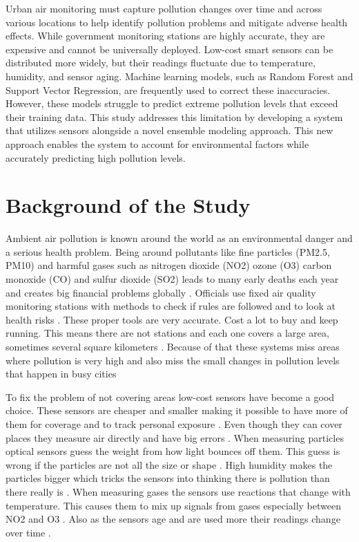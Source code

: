 Urban air monitoring must capture pollution changes over time and across various locations to help identify pollution problems and mitigate adverse health effects. While government monitoring stations are highly accurate, they are expensive and cannot be universally deployed. Low-cost smart sensors can be distributed more widely, but their readings fluctuate due to temperature, humidity, and sensor aging. Machine learning models, such as Random Forest and Support Vector Regression, are frequently used to correct these inaccuracies. However, these models struggle to predict extreme pollution levels that exceed their training data. This study addresses this limitation by developing a system that utilizes sensors alongside a novel ensemble modeling approach. This new approach enables the system to account for environmental factors while accurately predicting high pollution levels.
\section{Background of the Study}
\label{sec: back}
Ambient air pollution is known around the world as an environmental danger and a serious health problem. Being around pollutants like fine particles (PM2.5, PM10) and harmful gases such as nitrogen dioxide (NO2) ozone (O3) carbon monoxide (CO) and sulfur dioxide (SO2) leads to many early deaths each year and creates big financial problems globally \cite{Concas_2021,WorldHealthOrganization_2026a}. Officials use fixed air quality monitoring stations with methods to check if rules are followed and to look at health risks \cite{Giordano_2021,WorldHealthOrganization_2026b}. These proper tools are very accurate. Cost a lot to buy and keep running. This means there are not stations and each one covers a large area, sometimes several square kilometers \cite{Concas_2021,Hayward_2024}. Because of that these systems miss areas where pollution is very high and also miss the small changes in pollution levels that happen in busy cities \cite{Concas_2021,Giordano_2021}

To fix the problem of not covering areas low-cost sensors have become a good choice. These sensors are cheaper and smaller making it possible to have more of them for coverage and to track personal exposure \cite{Concas_2021}. Even though they can cover places they measure air directly and have big errors \cite{Giordano_2021,Hayward_2024}. When measuring particles optical sensors guess the weight from how light bounces off them. This guess is wrong if the particles are not all the size or shape \cite{Giordano_2021}. High humidity makes the particles bigger which tricks the sensors into thinking there is pollution than there really is \cite{Giordano_2021,Hayward_2024}. When measuring gases the sensors use reactions that change with temperature. This causes them to mix up signals from gases especially between NO2 and O3 \cite{Hayward_2024}. Also as the sensors age and are used more their readings change over time \cite{Concas_2021,Hayward_2024}. 

